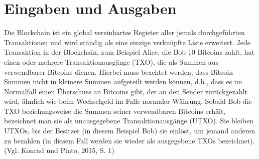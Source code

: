 \section{Eingaben und Ausgaben}
Die Blockchain ist ein global vereinbartes Register aller jemals durchgeführten Transaktionen und wird ständig als eine einzige 
verknüpfte Liste erweitert. Jede Transaktion in der Blockchain, zum Beispiel Alice, die Bob 10 Bitcoins zahlt, hat einen oder
mehrere Transaktionausgänge (TXO), die als Summen aus verwendbarer Bitcoins dienen. Hierbei muss beachtet werden, dass Bitcoin
Summen nicht in kleinere Summen aufgeteilt werden können, d.h., dass es im Normalfall einen Überschuss an Bitcoins gibt, der an 
den Sender zurückgezahlt wird, ähnlich wie beim Wechselgeld im Falle normaler Währung. Sobald Bob die TXO beziehungsweise 
die Summen seiner verwendbaren Bitcoins erhält, bezeichnet man sie als unausgegebene Transaktionausgänge (UTXO). Sie bleiben
UTXOs, bis der Besitzer (in diesem Beispiel Bob) sie einlöst, um jemand anderen zu bezahlen (in diesem Fall werden sie wieder
als ausgegebene TXOs bezeichnet). (Vgl. Konrad und Pinto, 2015, S. 1)


